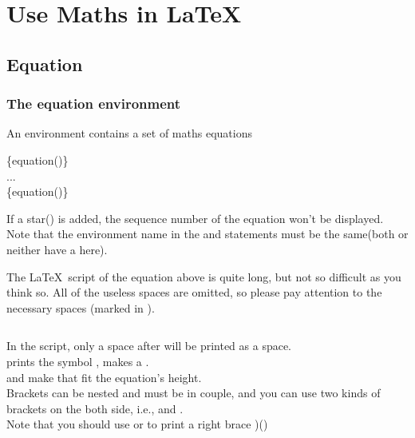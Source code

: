 \section{Use Maths in \LaTeX}
\begin{frame}
\end{frame}

\subsection{Equation}

\begin{frame}
	\frametitle{The equation environment}
	An  environment contains a set of maths equations
	\begin{command}
		\{equation(\structure{*})\}\\
		\qquad ...\\
		\{equation(\structure{*})\}\\
	\end{command}
	\begin{example}
		
	\end{example}
	If a star(\structure{*}) is added, the sequence number of the equation won't be displayed. Note that the environment name in the  and  statements must be the same(both or neither have a \structure{*} here).
\end{frame}

\begin{frame}[fragile]
	The \LaTeX\ script of the equation above is quite long, but not so difficult as you think so. All of the useless spaces are omitted, so please pay attention to the necessary spaces (marked in \textvisiblespace).

	
	\inputminted[showspaces]{latex}{examples/maths/curl.tex}
	
	In the script, only a space after \LC{\ }will be printed as a space. \\
	\LC{\partial} prints the symbol \structure{$\partial$},  makes a . \\
	
	\LC{\left(} and \LC{\right(} make  that fit the equation's height. \\
	Brackets can be nested and must be in couple, and you can use two kinds of brackets on the both side, i.e., \LC{\left[} and \LC{\right\rbrace}. \\
	Note that you should use \LC{\rbrace} or \LC{\}} to print a right brace )(\structure{$\rbrace$}) \\
\end{frame}

